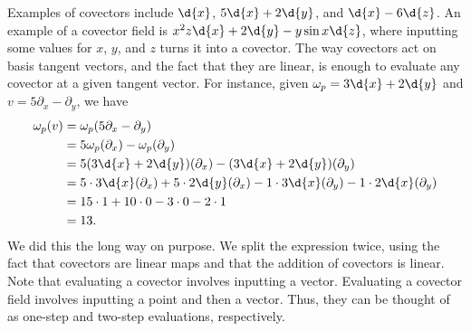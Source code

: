 \documentclass[a4paper,12pt]{article}
\begin{document}
Examples of covectors include $\d{x}$, $5 \d{x} + 2\d{y}$, and $\d{x} - 6\d{z}$.
An example of a covector field is $x^2 z \d{x} + 2 \d{y} - y\sin x \d{z}$, where inputting some values for $x$, $y$, and $z$ turns it into a covector.
The way covectors act on basis tangent vectors, and the fact that they are linear, is enough to evaluate any covector at a given tangent vector.
For instance, given $\omega_p = 3 \d{x} + 2 \d{y}$ and $v = 5 \partial_x - \partial_y$, we have
\begin{align*}
    \omega_p(v) &= \omega_p (5 \partial_x - \partial_y) \\
    &= 5 \omega_p (\partial_x) - \omega_p (\partial_y) \\
    &= 5(3 \d{x} + 2 \d{y}) (\partial_x) - (3 \d{x} + 2 \d{y}) (\partial_y) \\
    &= 5 \cdot 3 \d{x}(\partial_x) + 5 \cdot 2 \d{y}(\partial_x) - 1 \cdot 3 \d{x}(\partial_y) - 1 \cdot 2 \d{x}(\partial_y) \\
    &= 15 \cdot 1 + 10 \cdot 0 - 3 \cdot 0 - 2 \cdot 1 \\
    &= 13.
\end{align*}
We did this the long way on purpose.
We split the expression twice, using the fact that covectors are linear maps and that the addition of covectors is linear.
Note that evaluating a covector involves inputting a vector.
Evaluating a covector field involves inputting a point and then a vector.
Thus, they can be thought of as one-step and two-step evaluations, respectively.
\end{document}
